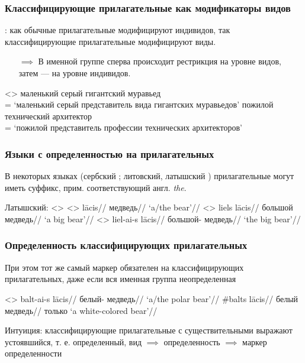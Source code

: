 \documentclass[
    9pt,
]{beamer}
\begin{document}
\begin{frame}
    \frametitle{Классифицирующие прилагательные как модификаторы видов}

    \textcite{mcnally2004relationaladjectivesproperties}: как обычные прилагательные модифицируют индивидов, так классифицирующие прилагательные модифицируют виды.

    \begin{itemize}
        \item[$\implies$] В именной группе сперва происходит рестрикция на уровне видов, затем — на уровне индивидов.
    \end{itemize}

    \pex<>
        \a маленький серый гигантский муравьед\\
        = `маленький серый представитель вида гигантских муравьедов'
        \a пожилой технический архитектор\\
        = `пожилой представитель профессии технических архитекторов'
    \xe

\end{frame}

\begin{frame}
    \frametitle{Языки с определенностью на прилагательных}

    В некоторых языках (сербский \parencite{rutkowski2005classificationprojectionpolish}; литовский, латышский \parencite{holvoet2012semanticmapdefinite}) прилагательные могут иметь суффикс, прим. соответствующий англ. \textit{the}.
    
    Латышский:
    \pex<>
        \a<> \begingl
            \gla lācis//
            \glb медведь//
            \glft `a/the bear'//
        \endgl
        \a<> \begingl
            \gla liels lācis//
            \glb большой медведь//
            \glft `a big bear'//
        \endgl
        \a<> \begingl
            \gla liel-ai-s lācis//
            \glb большой-\Def{} медведь//
            \glft `the big bear'//
        \endgl
    \xe

\end{frame}

\begin{frame}
    \frametitle{Определенность классифицирующих прилагательных}

    При этом тот же самый маркер обязателен на классифицирующих прилагательных, даже если вся именная группа неопределенная

    \pex<>
        \a \begingl
            \gla balt-ai-s lācis//
            \glb белый-\Def{} медведь//
            \glft `a/the polar bear'//
        \endgl
        \a \begingl
            \gla \ljudge\#balts lācis//
            \glb белый медведь//
            \glft только `a white-colored bear'//
        \endgl
    \xe

    Интуиция: классифицирующие прилагательные с существительными выражают устоявшийся, т. е. определенный, вид $\implies$ определенность $\implies$ маркер определенности
    
\end{frame}
\end{document}
